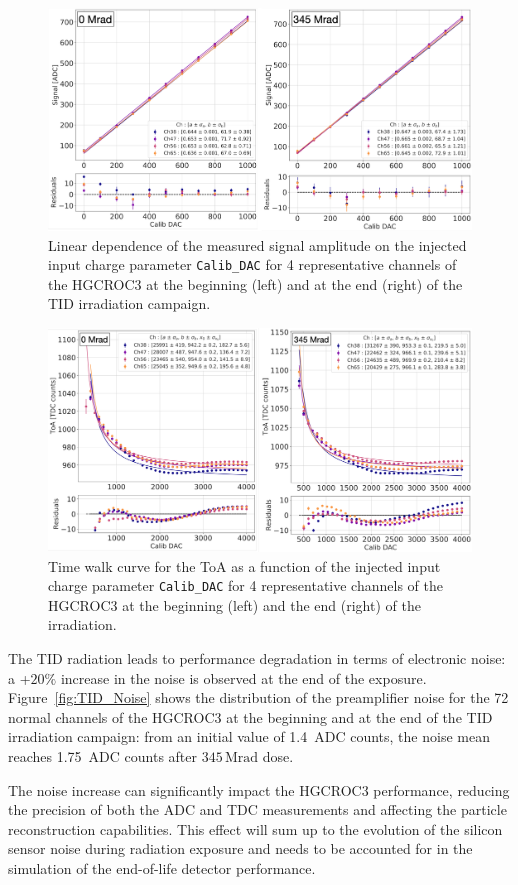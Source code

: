\begin{figure}
    \centering
    \includegraphics[width=0.7\linewidth]{Figures/HGCAL/TID_ADCLinearity.pdf}
    \caption{Linear dependence of the measured signal amplitude on the injected input charge parameter \texttt{Calib\_DAC} for 4 representative channels of the HGCROC3 at the beginning (left) and at the end (right) of the TID irradiation campaign.}
    \label{fig:TID_ADCLinearity}
\end{figure}

\begin{figure}
    \centering
    \includegraphics[width=0.7\linewidth]{Figures/HGCAL/TID_TimeWalk.pdf}
    \caption{Time walk curve for the ToA as a function of the injected input charge parameter \texttt{Calib\_DAC} for 4 representative channels of the HGCROC3 at the beginning (left) and the end (right) of the irradiation.}
    \label{fig:TID_TimeWalk}
\end{figure}

\bigbreak

The TID radiation leads to performance degradation in terms of electronic noise: a +$20\%$ increase in the noise is observed at the end of the exposure. Figure~\ref{fig:TID_Noise} shows the distribution of the preamplifier noise for the 72 normal channels of the HGCROC3 at the beginning and at the end of the TID irradiation campaign: from an initial value of 1.4~ADC counts, the noise mean reaches 1.75~ADC counts after $345\,\textrm{Mrad}$ dose. 

The noise increase can significantly impact the HGCROC3 performance, reducing the precision of both the ADC and TDC measurements and affecting the particle reconstruction capabilities. This effect will sum up to the evolution of the silicon sensor noise during radiation exposure and needs to be accounted for in the simulation of the end-of-life detector performance.

